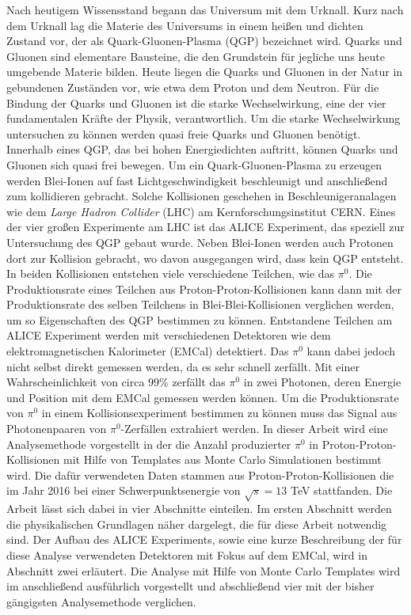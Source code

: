 Nach heutigem Wissensstand begann das Universum mit dem Urknall.
Kurz nach dem Urknall lag die Materie des Universums in einem heißen und dichten Zustand vor, der als Quark-Gluonen-Plasma (QGP) bezeichnet wird.
Quarks und Gluonen sind elementare Bausteine, die den Grundstein für jegliche uns heute umgebende Materie bilden.
Heute liegen die Quarks und Gluonen in der Natur in gebundenen Zuständen vor, wie etwa dem Proton und dem Neutron.
\newline
Für die Bindung der Quarks und Gluonen ist die starke Wechselwirkung, eine der vier fundamentalen Kräfte der Physik, verantwortlich.
Um die starke Wechselwirkung untersuchen zu können werden quasi freie Quarks und Gluonen benötigt.
Innerhalb eines QGP, das bei hohen Energiedichten auftritt, können Quarks und Gluonen sich quasi frei bewegen.
\newline
Um ein Quark-Gluonen-Plasma zu erzeugen werden Blei-Ionen auf fast Lichtgeschwindigkeit beschleunigt und anschließend zum kollidieren gebracht.
Solche Kollisionen geschehen in Beschleunigeranalagen wie dem \textit{Large Hadron Collider} (LHC) am Kernforschungsinstitut CERN.
Eines der vier großen Experimente am LHC ist das ALICE Experiment, das speziell zur Untersuchung des QGP gebaut wurde.
\newline
Neben Blei-Ionen werden auch Protonen dort zur Kollision gebracht, wo davon ausgegangen wird, dass kein QGP entsteht.
In beiden Kollisionen entstehen viele verschiedene Teilchen, wie das $\pi^{0}$.
Die Produktionsrate eines Teilchen aus Proton-Proton-Kollisionen kann dann mit der Produktionsrate des selben Teilchens in Blei-Blei-Kollisionen verglichen werden, um so Eigenschaften des QGP bestimmen zu können.
\newline
Entstandene Teilchen am ALICE Experiment werden mit verschiedenen Detektoren wie dem elektromagnetischen Kalorimeter (EMCal) detektiert.
Das $\pi^{0}$ kann dabei jedoch nicht selbst direkt gemessen werden, da es sehr schnell zerfällt.
Mit einer Wahrscheinlichkeit von circa $99\%$ zerfällt das $\pi^{0}$ in zwei Photonen, deren Energie und Position mit dem EMCal gemessen werden können.
Um die Produktionsrate von $\pi^{0}$ in einem Kollisionsexperiment bestimmen zu können muss das Signal aus Photonenpaaren von $\pi^{0}$-Zerfällen extrahiert werden.
\newline
In dieser Arbeit wird eine Analysemethode vorgestellt in der die Anzahl produzierter $\pi^{0}$ in Proton-Proton-Kollisionen mit Hilfe von Templates aus Monte Carlo Simulationen bestimmt wird.
Die dafür verwendeten Daten stammen aus Proton-Proton-Kollisionen die im Jahr 2016 bei einer Schwer\-punkts\-en\-er\-gie von $\sqrt{s}=13$ TeV stattfanden.
\newline
Die Arbeit lässt sich dabei in vier Abschnitte einteilen.
Im ersten Abschnitt werden die physikalischen Grundlagen näher dargelegt, die für diese Arbeit notwendig sind.
Der Aufbau des ALICE Experiments, sowie eine kurze Beschreibung der für diese Analyse verwendeten Detektoren mit Fokus auf dem EMCal, wird in Abschnitt zwei erläutert.
Die Analyse mit Hilfe von Monte Carlo Templates wird im anschließend ausführlich vorgestellt und abschließend vier mit der bisher gängigsten Analysemethode verglichen.